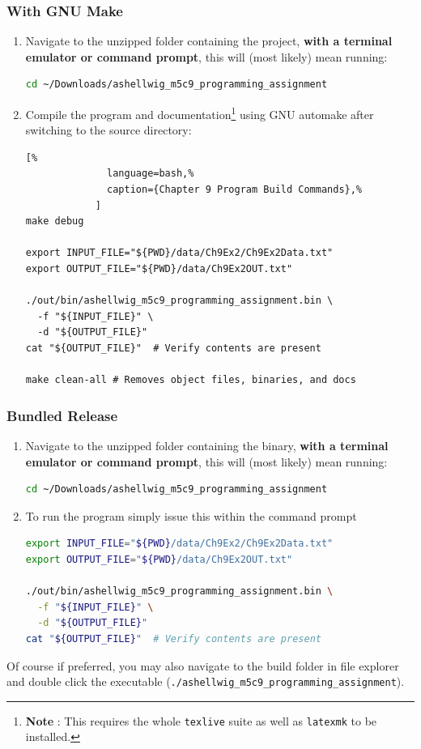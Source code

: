 \documentclass[a4paper, 11pt]{article}
\theoremstyle{definition}
\theoremstyle{plain}
\begin{document}
      \subsubsection{With GNU Make}
        \begin{enumerate}
          \item Navigate to the unzipped folder containing the project,
            \textbf{with a terminal emulator or command prompt}, this will
            (most likely) mean running:
            \begin{lstlisting}[language=bash]
cd ~/Downloads/ashellwig_m5c9_programming_assignment
            \end{lstlisting}
          \item Compile the program and documentation\footnote{\textbf{Note%
            }: This requires the whole \texttt{texlive} suite as well as
            \texttt{latexmk} to be installed.} using GNU automake after
            switching to the source directory:
            \begin{lstlisting}[%
              language=bash,%
              caption={Chapter 9 Program Build Commands},%
            ]
make debug

export INPUT_FILE="${PWD}/data/Ch9Ex2/Ch9Ex2Data.txt"
export OUTPUT_FILE="${PWD}/data/Ch9Ex2OUT.txt"

./out/bin/ashellwig_m5c9_programming_assignment.bin \
  -f "${INPUT_FILE}" \
  -d "${OUTPUT_FILE}"
cat "${OUTPUT_FILE}"  # Verify contents are present

make clean-all # Removes object files, binaries, and docs
            \end{lstlisting}
          \end{enumerate}
      \subsubsection{Bundled Release}
        \begin{enumerate}
          \item Navigate to the unzipped folder containing the binary,
            \textbf{with a terminal emulator or command prompt}, this will
            (most likely) mean running:
            \begin{lstlisting}[language=bash]
cd ~/Downloads/ashellwig_m5c9_programming_assignment
            \end{lstlisting}
          \item To run the program simply issue this within the command
            prompt
            \begin{lstlisting}[language=bash]
export INPUT_FILE="${PWD}/data/Ch9Ex2/Ch9Ex2Data.txt"
export OUTPUT_FILE="${PWD}/data/Ch9Ex2OUT.txt"

./out/bin/ashellwig_m5c9_programming_assignment.bin \
  -f "${INPUT_FILE}" \
  -d "${OUTPUT_FILE}"
cat "${OUTPUT_FILE}"  # Verify contents are present
            \end{lstlisting}
        \end{enumerate}
        Of course if preferred, you may also navigate to the build folder in
          file explorer and double click the executable
          (\texttt{./ashellwig\_m5c9\_programming\_assignment}).
\end{document}
